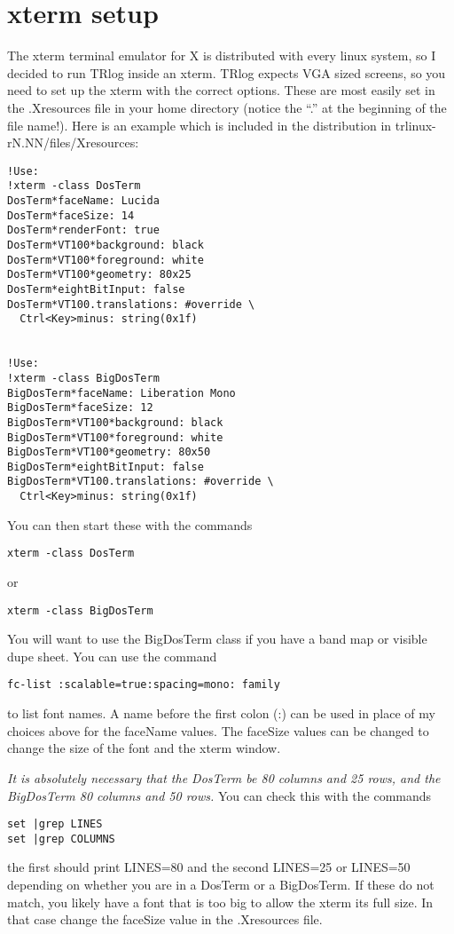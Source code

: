 \documentclass[12pt]{article}
\begin{document}
\section{xterm setup}
The xterm terminal emulator for X is distributed with every linux system,
so I decided to run TRlog inside an xterm.
TRlog expects VGA sized screens, so you need to set up the xterm with
the correct options. These are most easily set in the .Xresources file
in your home directory (notice the ``.'' at the beginning of the
file name!).  Here is an example which is included in the
distribution in trlinux-rN.NN/files/Xresources:
\begin{verbatim}
!Use:
!xterm -class DosTerm
DosTerm*faceName: Lucida
DosTerm*faceSize: 14
DosTerm*renderFont: true
DosTerm*VT100*background: black
DosTerm*VT100*foreground: white
DosTerm*VT100*geometry: 80x25
DosTerm*eightBitInput: false
DosTerm*VT100.translations: #override \
  Ctrl<Key>minus: string(0x1f)


!Use:
!xterm -class BigDosTerm
BigDosTerm*faceName: Liberation Mono
BigDosTerm*faceSize: 12
BigDosTerm*VT100*background: black
BigDosTerm*VT100*foreground: white
BigDosTerm*VT100*geometry: 80x50
BigDosTerm*eightBitInput: false
BigDosTerm*VT100.translations: #override \
  Ctrl<Key>minus: string(0x1f)
\end{verbatim}

You can then start these with the commands
\begin{verbatim}
xterm -class DosTerm
\end{verbatim}
or
\begin{verbatim}
xterm -class BigDosTerm
\end{verbatim}
You will want to use the BigDosTerm class if you have a band map  or visible
dupe sheet.
You can use the command
\begin{verbatim}
fc-list :scalable=true:spacing=mono: family
\end{verbatim}
to list font names. A name before the first colon (:) can be used
in place of my choices above for the faceName values. The faceSize
values can be changed to change the size of the font and the xterm window.

{\em It is absolutely necessary that
the DosTerm be 80 columns and 25 rows,
and the BigDosTerm 80 columns and 50 rows. }
You can check this with the commands
\begin{verbatim}
set |grep LINES
set |grep COLUMNS
\end{verbatim}
the first should print LINES=80 and the second LINES=25 or LINES=50 depending
on whether you are in a DosTerm or a BigDosTerm. If these do not
match, you likely have a font that is too big to allow the xterm its
full size. In that case change the faceSize value in the .Xresources file.
\end{document}
